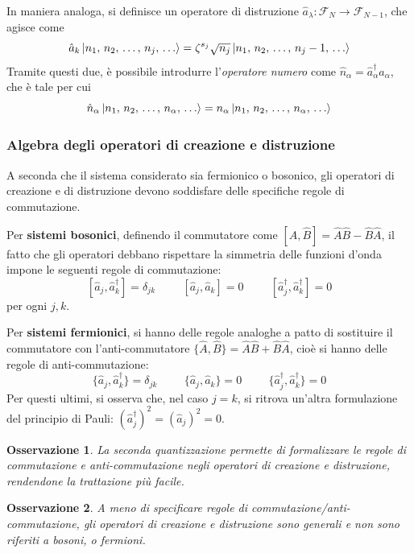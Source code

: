 \documentclass[11pt, a4paper]{scrartcl}
\theoremstyle{style}
\newtheorem{osservazione}{Osservazione}[section]
\theoremstyle{style1}
\numberwithin{equation}{subsection}
\begin{document}
In maniera analoga, si definisce un operatore di distruzione $\hat{a}_\lambda :\mathcal{F} _N \to \mathcal{F} _{N-1} $, che agisce come
\[
\hat{a}_k \ket{n_1,\, n_2,\, \ldots,\, n_j ,\, \ldots}  = \zeta^{s_j}\sqrt{n_j} \ket{n_1,\, n_2,\, \ldots,\, n_j-1 ,\, \ldots}
\] 
Tramite questi due, \`e possibile introdurre l'\textit{operatore numero} come $\hat{n}_\alpha = \hat{a}^\dagger _\alpha  \hat{a}_\alpha $, che \`e tale per cui
\[
\hat{n}_\alpha \ket{n_1 ,\, n_2 ,\, \ldots,\, n_\alpha ,\, \ldots} = n_\alpha \ket{n_1 ,\, n_2 ,\, \ldots,\, n_\alpha ,\, \ldots}
\] 
\subsubsection{Algebra degli operatori di creazione e distruzione}
A seconda che il sistema considerato sia fermionico o bosonico, gli operatori di creazione e di distruzione devono soddisfare delle specifiche regole di commutazione.

Per \textbf{sistemi bosonici}, definendo il commutatore come $[ \hat{A},\hat{B} ] = \hat{A}\hat{B}- \hat{B}\hat{A}$, il fatto che gli operatori debbano rispettare la simmetria delle funzioni d'onda impone le seguenti regole di commutazione:
\[
	[\hat{a}_j , \hat{a}^\dagger _k] = \delta _{jk}  \hspace{1cm} [\hat{a}_j , \hat{a}_k] = 0 \hspace{1cm} [\hat{a}^\dagger _j, \hat{a}^\dagger _k] = 0
\] 
per ogni $j,k$.

Per \textbf{sistemi fermionici}, si hanno delle regole analoghe a patto di sostituire il commutatore con l'anti-commutatore $\{\hat{A},\hat{B}\} = \hat{A}\hat{B}+ \hat{B}\hat{A}$, cio\`e si hanno delle regole di anti-commutazione:
\[
	\{\hat{a}_j , \hat{a}^\dagger _k\} = \delta _{jk}  \hspace{1cm} \{\hat{a}_j , \hat{a}_k\} = 0 \hspace{1cm} \{\hat{a}^\dagger _j, \hat{a}^\dagger _k\} = 0
\] 
Per questi ultimi, si osserva che, nel caso $j=k$, si ritrova un'altra formulazione del principio di Pauli: $(\hat{a}_j^\dagger)^2 = (\hat{a}_j)^2 = 0 $.
\begin{osservazione}
La seconda quantizzazione permette di formalizzare le regole di commutazione e anti-commutazione negli operatori di creazione e distruzione, rendendone la trattazione pi\`u facile.
\end{osservazione}
\begin{osservazione}
A meno di specificare regole di commutazione/anti-commutazione, gli operatori di creazione e distruzione sono generali e non sono riferiti a bosoni, o fermioni.
\end{osservazione}
\end{document}
